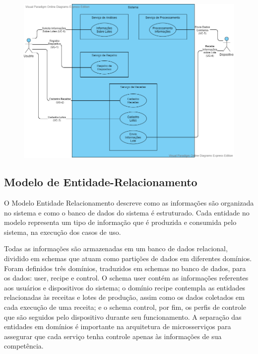 \begin{figure}[H]
    \centering
    \includegraphics[scale=0.45]{figuras/projeto/software/diagrama_casos_de_uso.png}
    \label{fig:diagrama_caso_de_usos}
\end{figure}

\subsection{Modelo de Entidade-Relacionamento}

O Modelo Entidade Relacionamento descreve como as informações são organizada no sistema e como o banco de dados do sistema é estruturado. 
Cada entidade no modelo representa um tipo de informação que é produzida e consumida pelo sistema, na execução dos casos de uso. 

Todas as informações são armazenadas em um banco de dados relacional, dividido em schemas que atuam como partições de dados em diferentes domínios. 
Foram definidos três domínios, traduzidos em schemas no banco de dados, para os dados: user, recipe e control. O schema user contém as informações 
referentes aos usuários e dispositivos do sistema; o domínio recipe contempla as entidades relacionadas às receitas e lotes de produção, assim como 
os dados coletados em cada execução de uma receita; e o schema control, por fim, os perfis de controle que são seguidos pelo dispositivo durante 
seu funcionamento. A separação das entidades em domínios é importante na arquitetura de microsserviços para assegurar que cada serviço tenha 
controle apenas às informações de sua competência. 

